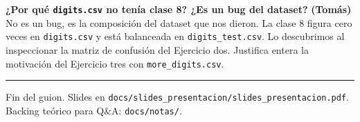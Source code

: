 \documentclass[11pt,a4paper]{article}
\newcommand{\code}[1]{\texttt{\textcolor{accent}{#1}}}
\newcommand{\file}[1]{\texttt{\small #1}}
\begin{document}
\begin{cue}
\textbf{¿Por qué \code{digits.csv} no tenía clase 8? ¿Es un bug del dataset?} \textbf{(Tomás)}\\
No es un bug, es la composición del dataset que nos dieron. La clase 8 figura cero veces en \code{digits.csv} y está balanceada en \code{digits\_test.csv}. Lo descubrimos al inspeccionar la matriz de confusión del Ejercicio dos. Justifica entera la motivación del Ejercicio tres con \code{more\_digits.csv}.
\end{cue}

\bigskip
\noindent\rule{\linewidth}{0.4pt}\par
\smallskip
\noindent\textcolor{muted}{\small Fin del guion. Slides en \file{docs/slides\_presentacion/slides\_presentacion.pdf}. Backing teórico para Q\&A: \file{docs/notas/}.}
\end{document}

